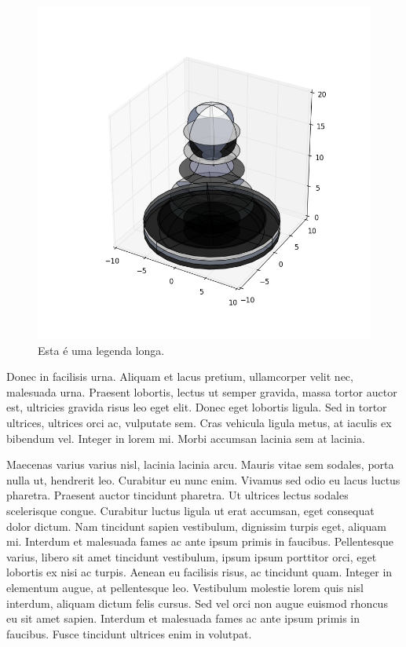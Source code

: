 \documentclass{article}
\begin{document}
	
	\begin{figure}[H]
	\centering
	\includegraphics[width=0.7\linewidth]{figuras/figure_1}
	\caption[Leganda Curta]{Esta é uma legenda longa.}
	\label{fig:figure_1}
	\end{figure}
	
	Donec in facilisis urna. Aliquam et lacus pretium, ullamcorper velit nec, malesuada urna. Praesent lobortis, lectus ut semper gravida, massa tortor auctor est, ultricies gravida risus leo eget elit. Donec eget lobortis ligula. Sed in tortor ultrices, ultrices orci ac, vulputate sem. Cras vehicula ligula metus, at iaculis ex bibendum vel. Integer in lorem mi. Morbi accumsan lacinia sem at lacinia.
	
	Maecenas varius varius nisl, lacinia lacinia arcu. Mauris vitae sem sodales, porta nulla ut, hendrerit leo. Curabitur eu nunc enim. Vivamus sed odio eu lacus luctus pharetra. Praesent auctor tincidunt pharetra. Ut ultrices lectus sodales scelerisque congue. Curabitur luctus ligula ut erat accumsan, eget consequat dolor dictum. Nam tincidunt sapien vestibulum, dignissim turpis eget, aliquam mi. Interdum et malesuada fames ac ante ipsum primis in faucibus. Pellentesque varius, libero sit amet tincidunt vestibulum, ipsum ipsum porttitor orci, eget lobortis ex nisi ac turpis. Aenean eu facilisis risus, ac tincidunt quam. Integer in elementum augue, at pellentesque leo. Vestibulum molestie lorem quis nisl interdum, aliquam dictum felis cursus. Sed vel orci non augue euismod rhoncus eu sit amet sapien. Interdum et malesuada fames ac ante ipsum primis in faucibus. Fusce tincidunt ultrices enim in volutpat.
	
\end{document}

